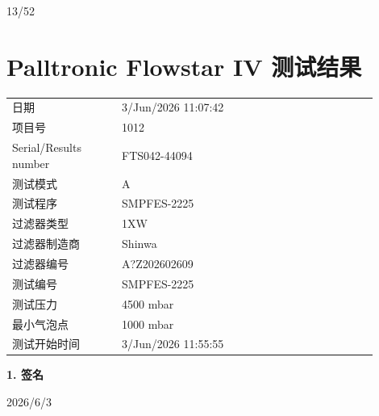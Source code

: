 \documentclass[UTF8,10pt,a4paper,fontset=fandol]{ctexart}
\newcommand{\fieldvalue}[1]{#1}
\newcommand{\handwritten}[1]{#1}
\begin{document}
\bigskip

\fieldvalue{\handwritten{13/52}}

\newpage

\section*{Palltronic Flowstar IV 测试结果}

\begin{tabular}{@{}p{0.27\linewidth}p{0.63\linewidth}@{}}
日期 &
\fieldvalue{3/Jun/2026 11:07:42}
\\[2pt]
项目号 &
\fieldvalue{1012}
\\[2pt]
Serial/Results number &
\fieldvalue{FTS042-44094}
\\[2pt]
测试模式 &
\fieldvalue{A}
\\[2pt]
测试程序 &
\fieldvalue{SMPFES-2225}
\\[2pt]
过滤器类型 &
\fieldvalue{1XW}
\\[2pt]
过滤器制造商 &
\fieldvalue{Shinwa}
\\[2pt]
过滤器编号 &
\fieldvalue{A?Z202602609}
\\[2pt]
测试编号 &
\fieldvalue{SMPFES-2225}
\\[2pt]
测试压力 &
\fieldvalue{4500 mbar}
\\[2pt]
最小气泡点 &
\fieldvalue{1000 mbar}
\\[2pt]
测试开始时间 &
\fieldvalue{3/Jun/2026 11:55:55}
\end{tabular}

\vspace{4pt}
\noindent\textbf{1. 签名}

\fieldvalue{\handwritten{2026/6/3}}
\end{document}
